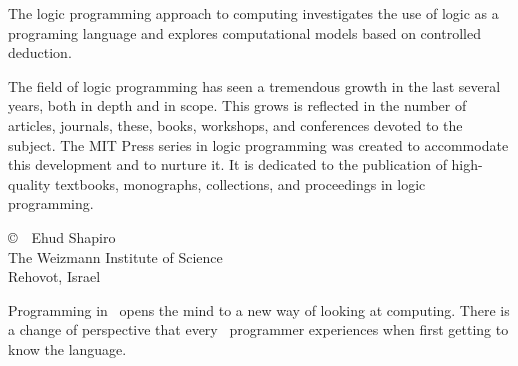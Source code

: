 \clearpage

The logic programming approach to computing investigates the use of logic as a programing language
and explores computational models based on controlled deduction.


The field of logic programming has seen a tremendous growth in the last several years, 
both in depth and in scope. This grows is reflected in the number of articles, journals, 
these, books, workshops, and conferences devoted to the subject. 
The MIT Press series in logic programming was created to accommodate this development 
and to nurture it. It is dedicated to the publication of high-quality textbooks, 
monographs, collections, and proceedings in logic program\-ming.


\bigskip

\noindent\copyright\ \cite{taop}\ Ehud Shapiro\\ The Weizmann Institute of Science\\Rehovot, Israel

\bigskip

Programming in \pro\ opens the mind to a new way of looking at compu\-ting.
There is a change of perspective that every \pro\ programmer experiences when first getting to know the language.


